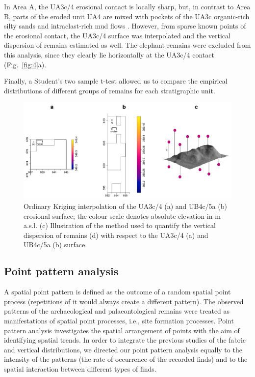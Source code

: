 \documentclass[preprint,authoryear,times]{elsarticle} %
\begin{document}
In Area A, the UA3c/4 erosional contact is locally sharp, but, in contrast to Area B, parts of the eroded unit UA4 are mixed with pockets of the UA3c organic-rich silty sands and intraclast-rich mud flows \citep{Karkanas}. However, from sparse known points of the erosional contact, the UA3c/4 surface was interpolated and the vertical dispersion of remains estimated as well. The elephant remains were excluded from this analysis, since they clearly lie horizontally at the UA3c/4 contact (Fig.~\ref{fig:4}a). %

Finally, a Student's two sample t-test allowed us to compare the empirical distributions of different groups of remains for each stratigraphic unit.

\begin{figure}[]
  \centering
  \includegraphics[width=1\textwidth]{./artwork/Fig5.pdf}
  \caption{Ordinary Kriging interpolation of the UA3c/4 (a) and UB4c/5a (b) erosional surface; the colour scale denotes absolute elevation in m a.s.l. (c) Illustration of the method used to quantify the vertical dispersion of remains (d) with respect to the UA3c/4 (a) and UB4c/5a (b) surface.}
  \label{fig:5}
\end{figure}

\subsection{Point pattern analysis}

A spatial point pattern is defined as the outcome of a random spatial point process (repetitions of it would always create a different pattern). The observed patterns of the archaeological and palaeontological remains were treated as manifestations of spatial point processes, i.e., site formation processes. Point pattern analysis investigates the spatial arrangement of points with the aim of identifying spatial trends. In order to integrate the previous studies of the fabric and vertical distributions, we directed our point pattern analysis equally to the intensity of the patterns (the rate of occurrence of the recorded finds) and to the spatial interaction between different types of finds.
\end{document}
